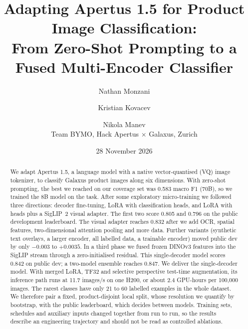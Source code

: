 \documentclass[11pt]{article}
\title{Adapting Apertus 1.5 for Product Image Classification:\\From Zero-Shot Prompting to a Fused Multi-Encoder Classifier}
\author{Nathan Monzani \and Kristian Kovacev \and Nikola Manev\\[2pt] \small Team BYMO, Hack Apertus $\times$ Galaxus, Zurich}
\date{28 November 2026}
\begin{document}
\maketitle

\begin{abstract}
We adapt Apertus 1.5, a language model with a native vector-quantised (VQ) image tokenizer, to classify Galaxus product images along six dimensions. With zero-shot prompting, the best we reached on our coverage set was 0.583 macro F1 (70B), so we trained the 8B model on the task. After some exploratory micro-training we followed three directions: decoder fine-tuning, LoRA with classification heads, and LoRA with heads plus a SigLIP~2 visual adapter. The first two score 0.805 and 0.796 on the public development leaderboard. The visual adapter reaches 0.832 after we add OCR, spatial features, two-dimensional attention pooling and more data. Further variants (synthetic text overlays, a larger encoder, all labelled data, a trainable encoder) moved public dev by only $-0.003$ to $+0.0035$. In a third phase we fused frozen DINOv3 features into the SigLIP stream through a zero-initialised residual. This single-decoder model scores 0.842 on public dev; a two-model ensemble reaches 0.847. We deliver the single-decoder model. With merged LoRA, TF32 and selective perspective test-time augmentation, its inference path runs at 11.7 images/s on one H200, or about 2.4 GPU-hours per 100,000 images. The rarest classes have only 21 to 60 labelled examples in the whole dataset. We therefore pair a fixed, product-disjoint local split, whose resolution we quantify by bootstrap, with the public leaderboard, which decides between models. Training sets, schedules and auxiliary inputs changed together from run to run, so the results describe an engineering trajectory and should not be read as controlled ablations.
\end{abstract}
\end{document}
